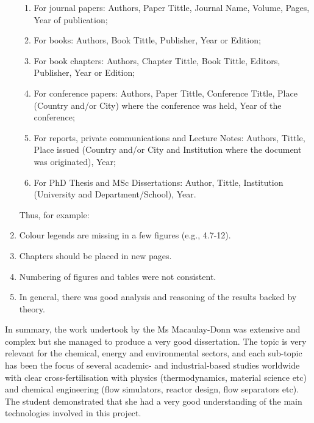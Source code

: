 \documentclass[14pt,twoside]{report}
\begin{document}
\begin{enumerate}
\begin{enumerate}
\item For journal papers: Authors, Paper Tittle, Journal Name, Volume, Pages, Year of publication;
\item For books: Authors, Book Tittle, Publisher, Year or Edition;
\item For book chapters: Authors, Chapter Tittle, Book Tittle, Editors, Publisher, Year or Edition;
\item For conference papers: Authors, Paper Tittle, Conference Tittle, Place (Country and/or City) where the conference was held, Year of the conference;
\item For reports, private communications and Lecture Notes: Authors, Tittle, Place issued (Country and/or City and Institution where the document was originated), Year;
\item For PhD Thesis and MSc Dissertations: Author, Tittle, Institution (University and Department/School), Year.
\end{enumerate}  
Thus, for example:
%
\item Colour legends are missing in a few figures (e.g., 4.7-12).  
%
\item Chapters should be placed in new pages.
%
\item Numbering of figures and tables were not consistent.
%
\item In general, there was good analysis and reasoning of the results backed by theory.
% 
\end{enumerate}
In summary, the work undertook by the Ms Macaulay-Donn was extensive and complex but she managed to produce a very good dissertation. The topic is very relevant for the chemical, energy and environmental sectors, and each sub-topic has been the focus of several academic- and industrial-based studies worldwide with clear cross-fertilisation with physics (thermodynamics, material science etc) and chemical engineering (flow simulators, reactor design, flow separators etc). The student demonstrated that she had a very good understanding of the main technologies involved in this project.
\end{document}
